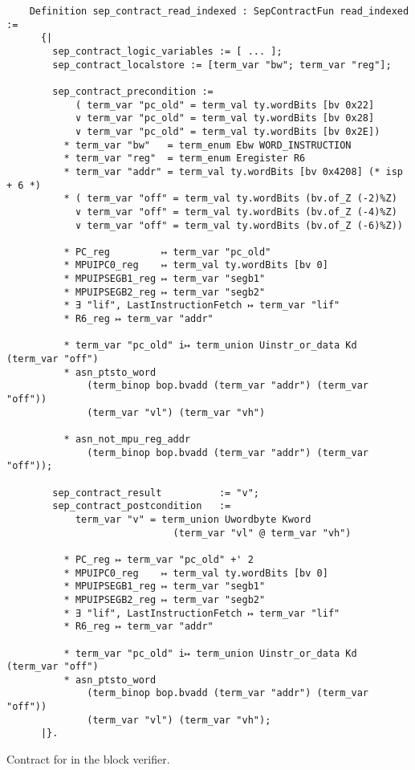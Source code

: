 \begin{listing}
  \begin{verbatim}
    Definition sep_contract_read_indexed : SepContractFun read_indexed :=
      {|
        sep_contract_logic_variables := [ ... ];
        sep_contract_localstore := [term_var "bw"; term_var "reg"];

        sep_contract_precondition :=
            ( term_var "pc_old" = term_val ty.wordBits [bv 0x22]
            ∨ term_var "pc_old" = term_val ty.wordBits [bv 0x28]
            ∨ term_var "pc_old" = term_val ty.wordBits [bv 0x2E])
          * term_var "bw"   = term_enum Ebw WORD_INSTRUCTION
          * term_var "reg"  = term_enum Eregister R6
          * term_var "addr" = term_val ty.wordBits [bv 0x4208] (* isp + 6 *)
          * ( term_var "off" = term_val ty.wordBits (bv.of_Z (-2)%Z)
            ∨ term_var "off" = term_val ty.wordBits (bv.of_Z (-4)%Z)
            ∨ term_var "off" = term_val ty.wordBits (bv.of_Z (-6)%Z))

          * PC_reg         ↦ term_var "pc_old"
          * MPUIPC0_reg    ↦ term_val ty.wordBits [bv 0]
          * MPUIPSEGB1_reg ↦ term_var "segb1"
          * MPUIPSEGB2_reg ↦ term_var "segb2"
          * ∃ "lif", LastInstructionFetch ↦ term_var "lif"
          * R6_reg ↦ term_var "addr"

          * term_var "pc_old" i↦ term_union Uinstr_or_data Kd (term_var "off")
          * asn_ptsto_word
              (term_binop bop.bvadd (term_var "addr") (term_var "off"))
              (term_var "vl") (term_var "vh")

          * asn_not_mpu_reg_addr
              (term_binop bop.bvadd (term_var "addr") (term_var "off"));

        sep_contract_result          := "v";
        sep_contract_postcondition   :=
            term_var "v" = term_union Uwordbyte Kword
                             (term_var "vl" @ term_var "vh")

          * PC_reg ↦ term_var "pc_old" +' 2
          * MPUIPC0_reg    ↦ term_val ty.wordBits [bv 0]
          * MPUIPSEGB1_reg ↦ term_var "segb1"
          * MPUIPSEGB2_reg ↦ term_var "segb2"
          * ∃ "lif", LastInstructionFetch ↦ term_var "lif"
          * R6_reg ↦ term_var "addr"

          * term_var "pc_old" i↦ term_union Uinstr_or_data Kd (term_var "off")
          * asn_ptsto_word
              (term_binop bop.bvadd (term_var "addr") (term_var "off"))
              (term_var "vl") (term_var "vh");
      |}.
  \end{verbatim}
  \caption{Contract for  in the block verifier.}
  \label{lst:bv-read_indexed}
\end{listing}

